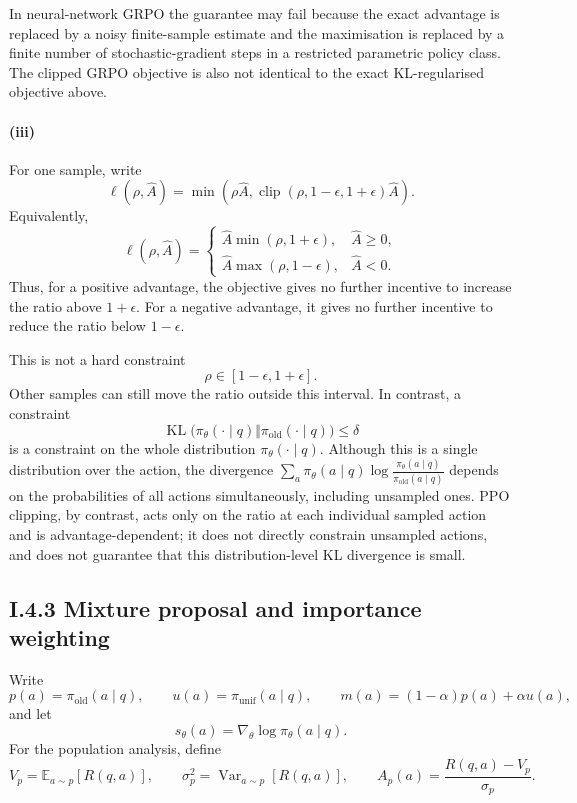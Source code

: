 In neural-network GRPO the guarantee may fail because the exact advantage is
replaced by a noisy finite-sample estimate and the maximisation is replaced by
a finite number of stochastic-gradient steps in a restricted parametric policy
class. The clipped GRPO objective is also not identical to the exact
KL-regularised objective above.

\paragraph{(iii)}
For one sample, write
\[
\ell(\rho,\hat A)
=
\min\left(
\rho\hat A,
\operatorname{clip}(\rho,1-\epsilon,1+\epsilon)\hat A
\right).
\]
Equivalently,
\[
\ell(\rho,\hat A)
=
\begin{cases}
\hat A\min(\rho,1+\epsilon), & \hat A\geq 0,\\[2mm]
\hat A\max(\rho,1-\epsilon), & \hat A<0.
\end{cases}
\]
Thus, for a positive advantage, the objective gives no further incentive to
increase the ratio above $1+\epsilon$. For a negative advantage, it gives no
further incentive to reduce the ratio below $1-\epsilon$.

This is not a hard constraint
\[
\rho\in[1-\epsilon,1+\epsilon].
\]
Other samples can still move the ratio outside this interval. In contrast, a
constraint
\[
\operatorname{KL}
\bigl(
\pi_\theta(\cdot\mid q)
\Vert
\pi_{\mathrm{old}}(\cdot\mid q)
\bigr)
\leq\delta
\]
is a constraint on the whole distribution $\pi_\theta(\cdot\mid q)$. Although this
is a single distribution over the action, the divergence
$\sum_a\pi_\theta(a\mid q)\log\frac{\pi_\theta(a\mid q)}{\pi_{\mathrm{old}}(a\mid q)}$
depends on the probabilities of all actions simultaneously, including unsampled
ones. PPO clipping, by contrast, acts only on the ratio at each individual
sampled action and is advantage-dependent; it does not directly constrain
unsampled actions, and does not guarantee that this distribution-level KL
divergence is small.


\subsection*{I.4.3 Mixture proposal and importance weighting}

Write
\[
p(a)=\pi_{\mathrm{old}}(a\mid q),
\qquad
u(a)=\pi_{\mathrm{unif}}(a\mid q),
\qquad
m(a)=(1-\alpha)p(a)+\alpha u(a),
\]
and let
\[
s_\theta(a)=\nabla_\theta\log\pi_\theta(a\mid q).
\]
For the population analysis, define
\[
V_p=\mathbb{E}_{a\sim p}[R(q,a)],
\qquad
\sigma_p^2=\operatorname{Var}_{a\sim p}[R(q,a)],
\qquad
A_p(a)=\frac{R(q,a)-V_p}{\sigma_p}.
\]

